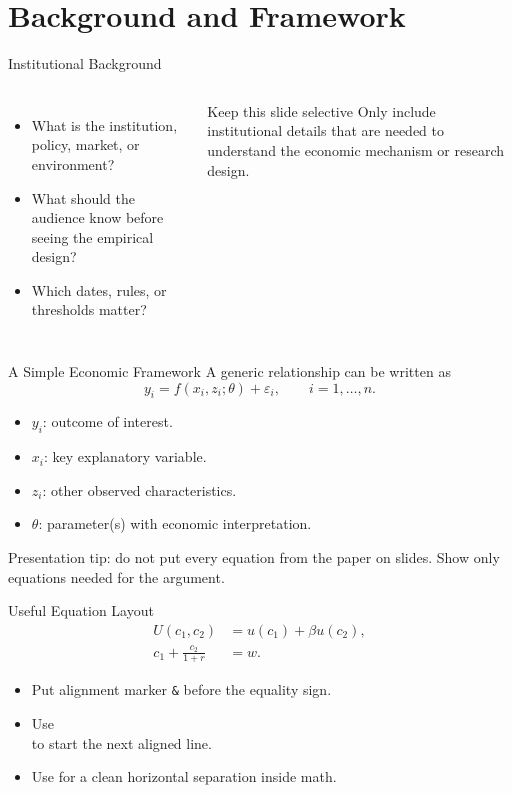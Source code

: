 \documentclass[10pt,aspectratio=169]{beamer}
\begin{document}
\section{Background and Framework}

\begin{frame}{Institutional Background}
\begin{columns}[T]
\begin{itemize}
  \item What is the institution, policy, market, or environment?
  \item What should the audience know before seeing the empirical design?
  \item Which dates, rules, or thresholds matter?
\end{itemize}

\begin{block}{Keep this slide selective}
Only include institutional details that are needed to understand the economic mechanism or research design.
\end{block}
\end{columns}
\end{frame}

\begin{frame}{A Simple Economic Framework}
A generic relationship can be written as
\[
  y_i = f(x_i,z_i;\theta) + \varepsilon_i,
  \qquad i=1,\ldots,n.
\]

\begin{itemize}
  \item $y_i$: outcome of interest.
  \item $x_i$: key explanatory variable.
  \item $z_i$: other observed characteristics.
  \item $\theta$: parameter(s) with economic interpretation.
\end{itemize}

\vspace{0.4em}
\alert{Presentation tip:} do not put every equation from the paper on slides. Show only equations needed for the argument.
\end{frame}

\begin{frame}{Useful Equation Layout}
\begin{align}
  U(c_1,c_2) &= u(c_1) + \beta u(c_2), \\
  c_1 + \frac{c_2}{1+r} &= w.
\end{align}

\begin{itemize}
  \item Put alignment marker \texttt{\&} before the equality sign.
  \item Use \texttt{\\} to start the next aligned line.
  \item Use \texttt{\qquad} for a clean horizontal separation inside math.
\end{itemize}
\end{frame}
\end{document}
